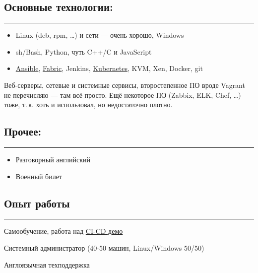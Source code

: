 \documentclass[11pt, a4paper]{article}
\newcommand{\Delimitline}{
  \vspace{-4ex}
  \textcolor[RGB]{120,120,120}{\rule{\linewidth}{1pt}}
  \vspace{-4ex}
}
\begin{document}
\subsection*{Основные технологии:}
\Delimitline
\begin{itemize}
  \item Linux (deb, rpm, \dots) и сети — очень хорошо, Windows
  \item sh/Bash, Python, чуть C++/C и JavaScript
  \item \href{https://github.com/bititanb/ansible-taskmngr}{Ansible}, \href{https://bitbucket.org/bititanb/ivd-fabric/src}{Fabric}, Jenkins, \href{https://github.com/bititanb/ansible-taskmngr/tree/master/roles/taskmngr-kubernetes/templates}{Kubernetes}, KVM, Xen, Docker, git\par
\end{itemize}

Веб-серверы, сетевые и системные сервисы, второстепенное ПО вроде Vagrant не перечисляю — там всё просто. Ещё некоторое ПО (Zabbix, ELK, Chef, \dots) тоже, т.\,к. хоть и использовал, но недостаточно плотно.

\subsection*{Прочее:}
\Delimitline
\begin{itemize}
  \item Разговорный английский
  \item Военный билет
\end{itemize}

\subsection*{Опыт работы}
\Delimitline
\begin{etaremune}
  \item Самообучение, работа над \href{https://github.com/bititanb/CI-CD-pipeline}{CI-CD демо}
  \item Системный администратор (40-50 машин, Linux/Windows 50/50)
  \item Англоязычная техподдержка
\end{etaremune}
\end{document}
